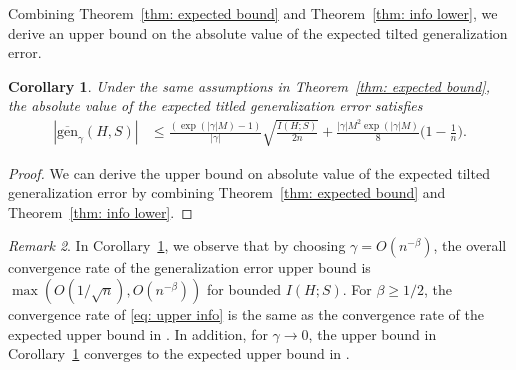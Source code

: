 \documentclass{article}
\theoremstyle{plain}
\theoremstyle{plain}
\newtheorem{theorem}{Theorem}[section]
\newtheorem{corollary}[theorem]{Corollary}
\theoremstyle{definition}
\theoremstyle{remark}
\newtheorem{remark}[theorem]{Remark}
\newcommand{\var}{\mathrm{Var}}
\begin{document}
Combining Theorem~\ref{thm: expected bound} and Theorem~\ref{thm: info lower}, we derive an upper bound on the absolute value of the expected tilted generalization error.
\begin{tcolorbox}
    \begin{corollary}\label{cor: expected |gen|}
    Under the same assumptions in Theorem~\ref{thm: expected bound}, the absolute value of the expected titled generalization error satisfies
    \begin{equation} \label{eq: upper info}
        \begin{split}
            | \overline{\mathrm{gen}}_{\gamma}(H,S)|&\leq \frac{(\exp(|\gamma| M)-1)}{|\gamma|}\sqrt{\frac{ I(H;S)}{2n}}+\frac{|\gamma| M^2\exp(|\gamma| M)}{8 }\Big(1-\frac{1}{n}\Big).
        \end{split}
    \end{equation}
\end{corollary}
\end{tcolorbox}
\begin{proof}
    We can derive the upper bound on absolute value of the expected tilted generalization error by combining Theorem~\ref{thm: expected bound} and Theorem~\ref{thm: info lower}.
\end{proof}
\begin{remark}
    In Corollary~\ref{cor: expected |gen|}, we observe that by choosing $\gamma=O(n^{-\beta})$,
    the overall convergence rate of the generalization error upper bound is $\max(O(1/\sqrt{n}),O(n^{-\beta}))$ for bounded $I(H;S)$. For $\beta\geq 1/2$, the convergence rate of \eqref{eq: upper info} is the same as the convergence rate of the expected upper bound in \citep{xu2017information}. In addition, for $\gamma\rightarrow 0$, the upper bound in Corollary~\ref{cor: expected |gen|} converges to the expected upper bound in \citep{xu2017information}.
\end{remark}
\end{document}
